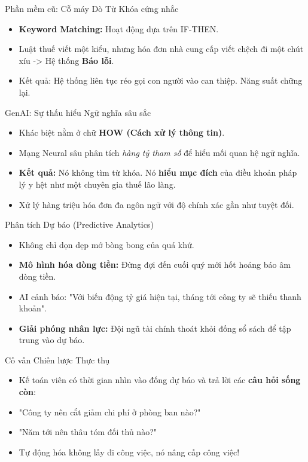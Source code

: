 \documentclass[aspectratio=169,12pt]{beamer}
\begin{document}
\begin{frame}{Phần mềm cũ: Cỗ máy Dò Từ Khóa cứng nhắc}
    \begin{itemize}
        \item \textbf{Keyword Matching:} Hoạt động dựa trên IF-THEN.
        \item Luật thuế viết một kiểu, nhưng hóa đơn nhà cung cấp viết chệch đi một chút xíu -> Hệ thống \textbf{Báo lỗi}.
        \item Kết quả: Hệ thống liên tục réo gọi con người vào can thiệp. Năng suất chững lại.
    \end{itemize}
\end{frame}

\begin{frame}{GenAI: Sự thấu hiểu Ngữ nghĩa sâu sắc}
    \begin{itemize}
        \item Khác biệt nằm ở chữ \textbf{HOW (Cách xử lý thông tin)}.
        \item Mạng Neural sâu phân tích \textit{hàng tỷ tham số} để hiểu mối quan hệ ngữ nghĩa.
        \item \textbf{Kết quả:} Nó không tìm từ khóa. Nó \textbf{hiểu mục đích} của điều khoản pháp lý y hệt như một chuyên gia thuế lão làng.
        \item Xử lý hàng triệu hóa đơn đa ngôn ngữ với độ chính xác gần như tuyệt đối.
    \end{itemize}
\end{frame}

\begin{frame}{Phân tích Dự báo (Predictive Analytics)}
    \begin{itemize}
        \item Không chỉ dọn dẹp mớ bòng bong của quá khứ.
        \item \textbf{Mô hình hóa dòng tiền:} Đừng đợi đến cuối quý mới hốt hoảng báo âm dòng tiền.
        \item AI cảnh báo: "Với biến động tỷ giá hiện tại, tháng tới công ty sẽ thiếu thanh khoản".
        \item \textbf{Giải phóng nhân lực:} Đội ngũ tài chính thoát khỏi đống sổ sách để tập trung vào dự báo.
    \end{itemize}
\end{frame}

\begin{frame}{Cố vấn Chiến lược Thực thụ}
    \begin{itemize}
        \item Kế toán viên có thời gian nhìn vào đống dự báo và trả lời các \textbf{câu hỏi sống còn}:
        \item "Công ty nên cắt giảm chi phí ở phòng ban nào?"
        \item "Năm tới nên thâu tóm đối thủ nào?"
        \item Tự động hóa không lấy đi công việc, nó nâng cấp công việc!
    \end{itemize}
\end{frame}
\end{document}
